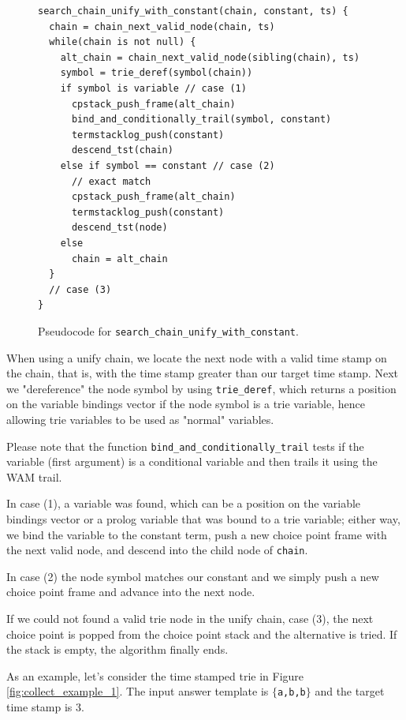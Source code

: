 \begin{figure}[H]
\begin{Verbatim}[fontsize=\small]
search_chain_unify_with_constant(chain, constant, ts) {
  chain = chain_next_valid_node(chain, ts)
  while(chain is not null) {
    alt_chain = chain_next_valid_node(sibling(chain), ts)
    symbol = trie_deref(symbol(chain))
    if symbol is variable // case (1)
      cpstack_push_frame(alt_chain)
      bind_and_conditionally_trail(symbol, constant)
      termstacklog_push(constant)
      descend_tst(chain)
    else if symbol == constant // case (2)
      // exact match
      cpstack_push_frame(alt_chain)
      termstacklog_push(constant)
      descend_tst(node)
    else
      chain = alt_chain
  }
  // case (3)
}
\end{Verbatim}
\caption{Pseudo\-code for \texttt{search\_chain\_unify\_with\_constant}.}
\label{fig:search_chain_unify_with_constant}
\end{figure}

When using a unify chain, we locate the next node with a valid time stamp on the chain, that is, with the time stamp greater than our target time stamp. Next we "dereference" the node symbol by using
\texttt{trie\_deref}, which returns a position on the variable bindings vector if the node symbol is a trie variable, hence allowing trie variables to be used as "normal" variables.

Please note that the function \texttt{bind\_and\_conditionally\_trail} tests if the variable (first argument) is a conditional variable and then trails it using the WAM trail.

In case (1), a variable was found, which can be a position on the variable bindings vector or a prolog variable that was bound to a trie variable; either way, we bind the variable to the constant term, push a new choice point frame with the next valid node, and descend into the child node of \texttt{chain}.

In case (2) the node symbol matches our constant and we simply push a new choice point frame and advance into the next node.

If we could not found a valid trie node in the unify chain, case (3), the next choice point is popped from the choice point stack and the alternative is tried. If the stack is empty, the algorithm finally ends.

As an example, let's consider the time stamped trie in Figure \ref{fig:collect_example_1}. The input answer template is $\{$\texttt{a,b,b}$\}$ and the target time stamp is 3.

